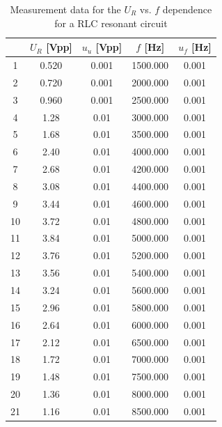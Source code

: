 \documentclass[a4paper]{article}
\begin{document}
\begin{table}[!htbp]
	\centering
	\begin{tabular}{c|cc|cc}
		\hline
		   & $U_R$ [Vpp] & $u_u$ [Vpp] & $f$ [Hz] & $u_f$ [Hz] \\
		\hline
		1  & 0.520       & 0.001       & 1500.000 & 0.001      \\
		2  & 0.720       & 0.001       & 2000.000 & 0.001      \\
		3  & 0.960       & 0.001       & 2500.000 & 0.001      \\
		4  & 1.28        & 0.01        & 3000.000 & 0.001      \\
		5  & 1.68        & 0.01        & 3500.000 & 0.001      \\
		6  & 2.40        & 0.01        & 4000.000 & 0.001      \\
		7  & 2.68        & 0.01        & 4200.000 & 0.001      \\
		8  & 3.08        & 0.01        & 4400.000 & 0.001      \\
		9  & 3.44        & 0.01        & 4600.000 & 0.001      \\
		10 & 3.72        & 0.01        & 4800.000 & 0.001      \\
		11 & 3.84        & 0.01        & 5000.000 & 0.001      \\
		12 & 3.76        & 0.01        & 5200.000 & 0.001      \\
		13 & 3.56        & 0.01        & 5400.000 & 0.001      \\
		14 & 3.24        & 0.01        & 5600.000 & 0.001      \\
		15 & 2.96        & 0.01        & 5800.000 & 0.001      \\
		16 & 2.64        & 0.01        & 6000.000 & 0.001      \\
		17 & 2.12        & 0.01        & 6500.000 & 0.001      \\
		18 & 1.72        & 0.01        & 7000.000 & 0.001      \\
		19 & 1.48        & 0.01        & 7500.000 & 0.001      \\
		20 & 1.36        & 0.01        & 8000.000 & 0.001      \\
		21 & 1.16        & 0.01        & 8500.000 & 0.001      \\
		\hline
	\end{tabular}
	\caption{Measurement data for the $U_R$ vs. $f$ dependence for a RLC resonant circuit}
\end{table}
\end{document}
